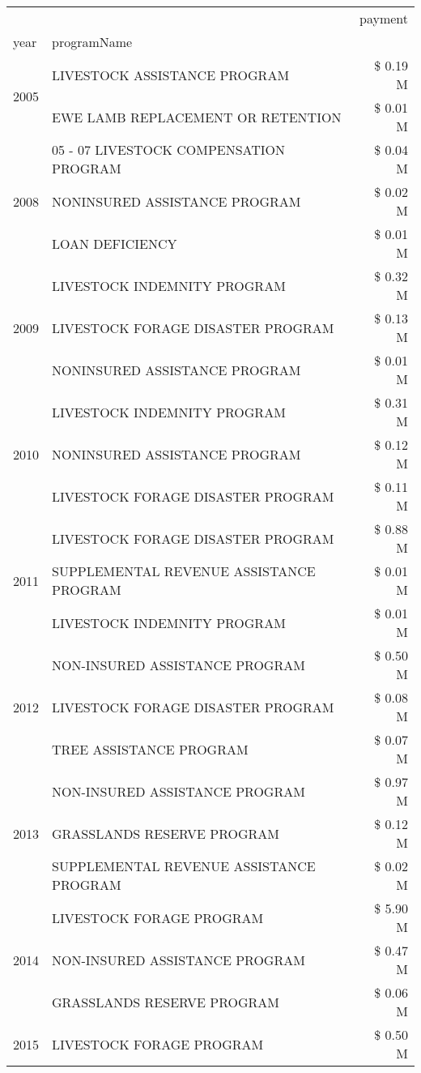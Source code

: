 \begin{tabular}{llr}
\toprule
 &  & payment \\
year & programName &  \\
\midrule
\multirow[t]{2}{*}{2005} & LIVESTOCK ASSISTANCE PROGRAM & \$ 0.19 M \\
 & EWE LAMB REPLACEMENT OR RETENTION & \$ 0.01 M \\
\cline{1-3}
\multirow[t]{3}{*}{2008} & 05 - 07 LIVESTOCK COMPENSATION PROGRAM & \$ 0.04 M \\
 & NONINSURED ASSISTANCE PROGRAM & \$ 0.02 M \\
 & LOAN DEFICIENCY & \$ 0.01 M \\
\cline{1-3}
\multirow[t]{3}{*}{2009} & LIVESTOCK INDEMNITY PROGRAM & \$ 0.32 M \\
 & LIVESTOCK FORAGE DISASTER  PROGRAM & \$ 0.13 M \\
 & NONINSURED ASSISTANCE PROGRAM & \$ 0.01 M \\
\cline{1-3}
\multirow[t]{3}{*}{2010} & LIVESTOCK INDEMNITY PROGRAM & \$ 0.31 M \\
 & NONINSURED ASSISTANCE PROGRAM & \$ 0.12 M \\
 & LIVESTOCK FORAGE DISASTER PROGRAM & \$ 0.11 M \\
\cline{1-3}
\multirow[t]{3}{*}{2011} & LIVESTOCK FORAGE DISASTER PROGRAM & \$ 0.88 M \\
 & SUPPLEMENTAL REVENUE ASSISTANCE PROGRAM & \$ 0.01 M \\
 & LIVESTOCK INDEMNITY PROGRAM & \$ 0.01 M \\
\cline{1-3}
\multirow[t]{3}{*}{2012} & NON-INSURED ASSISTANCE PROGRAM & \$ 0.50 M \\
 & LIVESTOCK FORAGE DISASTER PROGRAM & \$ 0.08 M \\
 & TREE ASSISTANCE PROGRAM & \$ 0.07 M \\
\cline{1-3}
\multirow[t]{3}{*}{2013} & NON-INSURED ASSISTANCE PROGRAM & \$ 0.97 M \\
 & GRASSLANDS RESERVE PROGRAM & \$ 0.12 M \\
 & SUPPLEMENTAL REVENUE ASSISTANCE PROGRAM & \$ 0.02 M \\
\cline{1-3}
\multirow[t]{3}{*}{2014} & LIVESTOCK FORAGE PROGRAM & \$ 5.90 M \\
 & NON-INSURED ASSISTANCE PROGRAM & \$ 0.47 M \\
 & GRASSLANDS RESERVE PROGRAM & \$ 0.06 M \\
\cline{1-3}
\multirow[t]{3}{*}{2015} & LIVESTOCK FORAGE PROGRAM & \$ 0.50 M \\

\end{tabular}
